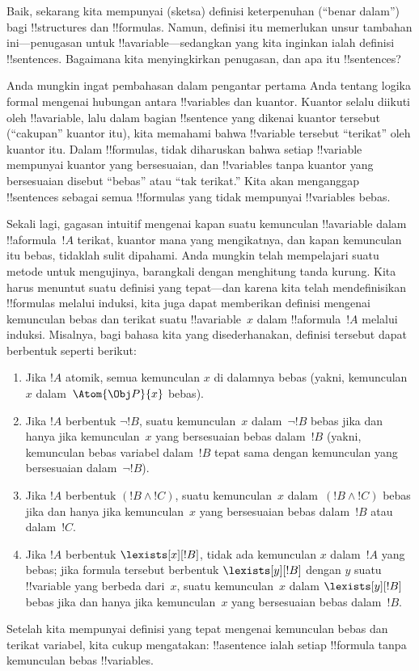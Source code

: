\documentclass[../../../include/open-logic-section]{subfiles}
\begin{document}


Baik, sekarang kita mempunyai (sketsa) definisi keterpenuhan (``benar
dalam'') bagi !!{structure}s dan !!{formula}s. Namun, definisi itu memerlukan
unsur tambahan ini---penugasan untuk !!a{variable}---sedangkan yang kita
inginkan ialah definisi !!{sentence}s. Bagaimana kita menyingkirkan penugasan,
dan apa itu !!{sentence}s?

Anda mungkin ingat pembahasan dalam pengantar pertama Anda tentang logika
formal mengenai hubungan antara !!{variable}s dan kuantor. Kuantor selalu
diikuti oleh !!a{variable}, lalu dalam bagian !!{sentence} yang dikenai
kuantor tersebut (``cakupan'' kuantor itu), kita memahami bahwa !!{variable}
tersebut ``terikat'' oleh kuantor itu. Dalam !!{formula}s, tidak diharuskan
bahwa setiap !!{variable} mempunyai kuantor yang bersesuaian, dan
!!{variable}s tanpa kuantor yang bersesuaian disebut ``bebas'' atau ``tak
terikat.'' Kita akan menganggap !!{sentence}s sebagai semua !!{formula}s yang
tidak mempunyai !!{variable}s bebas.

Sekali lagi, gagasan intuitif mengenai kapan suatu kemunculan !!a{variable}
dalam !!a{formula}~$!A$ terikat, kuantor mana yang mengikatnya, dan kapan
kemunculan itu bebas, tidaklah sulit dipahami. Anda mungkin telah mempelajari
suatu metode untuk mengujinya, barangkali dengan menghitung tanda kurung. Kita
harus menuntut suatu definisi yang tepat---dan karena kita telah
mendefinisikan !!{formula}s melalui induksi, kita juga dapat memberikan
definisi mengenai kemunculan bebas dan terikat suatu !!a{variable}~$x$ dalam
!!a{formula}~$!A$ melalui induksi. Misalnya, bagi bahasa kita yang
disederhanakan, definisi tersebut dapat berbentuk seperti berikut:
\begin{enumerate}
  \item Jika $!A$ atomik, semua kemunculan $x$ di dalamnya bebas (yakni,
  kemunculan $x$ dalam~$\Atom{\Obj P}{x}$ bebas).
  \item Jika $!A$ berbentuk $\lnot !B$, suatu kemunculan~$x$ dalam~$\lnot
  !B$ bebas jika dan hanya jika kemunculan~$x$ yang bersesuaian bebas
  dalam~$!B$ (yakni, kemunculan bebas variabel dalam~$!B$ tepat sama dengan
  kemunculan yang bersesuaian dalam~$\lnot !B$).
  \item Jika $!A$ berbentuk $(!B \land !C)$, suatu kemunculan~$x$
  dalam~$(!B \land !C)$ bebas jika dan hanya jika kemunculan~$x$ yang
  bersesuaian bebas dalam~$!B$ atau dalam~$!C$.
  \item Jika $!A$ berbentuk $\lexists[x][!B]$, tidak ada kemunculan $x$
  dalam~$!A$ yang bebas; jika formula tersebut berbentuk $\lexists[y][!B]$
  dengan $y$ suatu !!{variable} yang berbeda dari~$x$, suatu kemunculan~$x$ dalam
  $\lexists[y][!B]$ bebas jika dan hanya jika kemunculan~$x$ yang
  bersesuaian bebas dalam~$!B$.
\end{enumerate}

Setelah kita mempunyai definisi yang tepat mengenai kemunculan bebas dan
terikat variabel, kita cukup mengatakan: !!a{sentence} ialah setiap
!!{formula} tanpa kemunculan bebas !!{variable}s.
\end{document}

